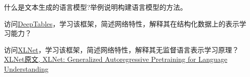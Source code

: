 \begin{think}
    什么是文本生成的语言模型?举例说明构建语言模型的方法。
\end{think}

\begin{think}
    访问\href{https://github.com/DataCanvasIO/deeptables}{DeepTables}，学习该框架，简述网络特性，解释其在结构化数据上的表示学习能力？
\end{think}

\begin{think}
    访问\href{https://github.com/zggl/xlnet}{​XLNet}，学习该框架，简述网络特性，解释其无监督语言表示学习原理？
    \href{https://arxiv.org/abs/1906.08237}{​XLNet原文, ​XLNet: Generalized Autoregressive Pretraining for Language Understanding}
%

\end{think} 